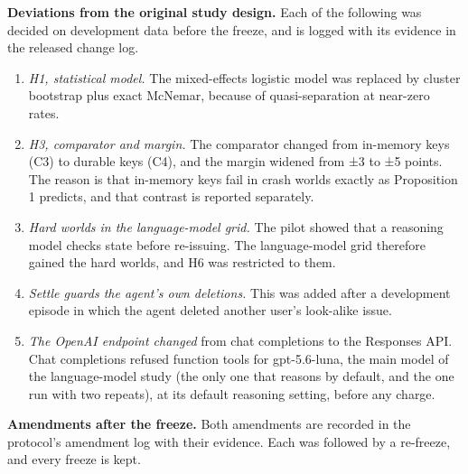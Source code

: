 \documentclass[
  10pt,
]{article}
\providecommand{\tightlist}{%
  \setlength{\itemsep}{0pt}\setlength{\parskip}{0pt}}
\begin{document}
\textbf{Deviations from the original study design.} Each of the
following was decided on development data before the freeze, and is
logged with its evidence in the released change log.

\begin{enumerate}
\def\labelenumi{\arabic{enumi}.}
\tightlist
\item
  \emph{H1, statistical model.} The mixed-effects logistic model was
  replaced by cluster bootstrap plus exact McNemar, because of
  quasi-separation at near-zero rates.
\item
  \emph{H3, comparator and margin.} The comparator changed from
  in-memory keys (C3) to durable keys (C4), and the margin widened from
  ±3 to ±5 points. The reason is that in-memory keys fail in crash
  worlds exactly as Proposition 1 predicts, and that contrast is
  reported separately.
\item
  \emph{Hard worlds in the language-model grid.} The pilot showed that a
  reasoning model checks state before re-issuing. The language-model
  grid therefore gained the hard worlds, and H6 was restricted to them.
\item
  \emph{Settle guards the agent's own deletions.} This was added after a
  development episode in which the agent deleted another user's
  look-alike issue.
\item
  \emph{The OpenAI endpoint changed} from chat completions to the
  Responses API. Chat completions refused function tools for
  gpt-5.6-luna, the main model of the language-model study (the only one
  that reasons by default, and the one run with two repeats), at its
  default reasoning setting, before any charge.
\end{enumerate}

\textbf{Amendments after the freeze.} Both amendments are recorded in
the protocol's amendment log with their evidence. Each was followed by a
re-freeze, and every freeze is kept.
\end{document}
